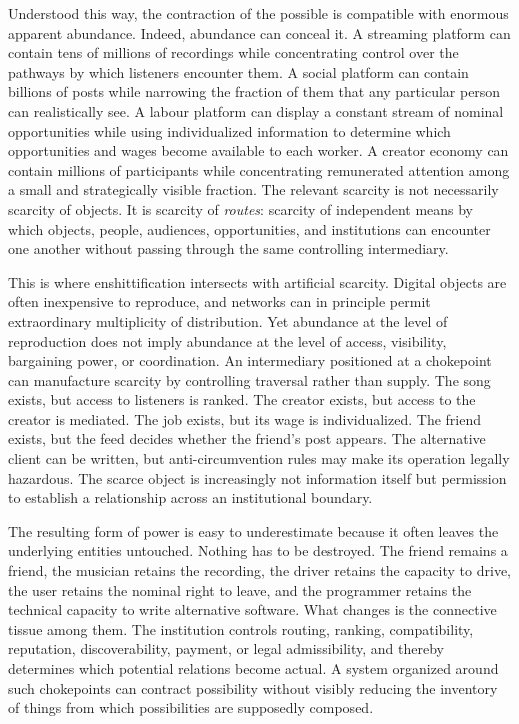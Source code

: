 \documentclass[11pt]{article}
\begin{document}
Understood this way, the contraction of the possible is compatible with enormous apparent abundance. Indeed, abundance can conceal it. A streaming platform can contain tens of millions of recordings while concentrating control over the pathways by which listeners encounter them. A social platform can contain billions of posts while narrowing the fraction of them that any particular person can realistically see. A labour platform can display a constant stream of nominal opportunities while using individualized information to determine which opportunities and wages become available to each worker. A creator economy can contain millions of participants while concentrating remunerated attention among a small and strategically visible fraction. The relevant scarcity is not necessarily scarcity of objects. It is scarcity of \emph{routes}: scarcity of independent means by which objects, people, audiences, opportunities, and institutions can encounter one another without passing through the same controlling intermediary.

This is where enshittification intersects with artificial scarcity. Digital objects are often inexpensive to reproduce, and networks can in principle permit extraordinary multiplicity of distribution. Yet abundance at the level of reproduction does not imply abundance at the level of access, visibility, bargaining power, or coordination. An intermediary positioned at a chokepoint can manufacture scarcity by controlling traversal rather than supply. The song exists, but access to listeners is ranked. The creator exists, but access to the creator is mediated. The job exists, but its wage is individualized. The friend exists, but the feed decides whether the friend's post appears. The alternative client can be written, but anti-circumvention rules may make its operation legally hazardous. The scarce object is increasingly not information itself but permission to establish a relationship across an institutional boundary.

The resulting form of power is easy to underestimate because it often leaves the underlying entities untouched. Nothing has to be destroyed. The friend remains a friend, the musician retains the recording, the driver retains the capacity to drive, the user retains the nominal right to leave, and the programmer retains the technical capacity to write alternative software. What changes is the connective tissue among them. The institution controls routing, ranking, compatibility, reputation, discoverability, payment, or legal admissibility, and thereby determines which potential relations become actual. A system organized around such chokepoints can contract possibility without visibly reducing the inventory of things from which possibilities are supposedly composed.
\end{document}
